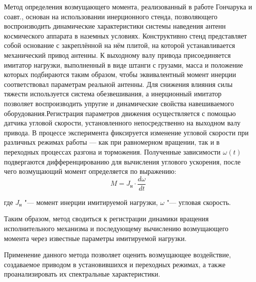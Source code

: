 Метод определения возмущающего момента, реализованный в работе Гончарука и соавт., %
основан на использовании инерционного стенда, позволяющего воспроизводить динамические характеристики системы наведения антенн космического аппарата в наземных условиях. Конструктивно стенд представляет собой основание с закреплённой на нём плитой, на которой устанавливается механический привод антенны. К выходному валу привода присоединяется имитатор нагрузки, выполненный в виде штанги с грузами, масса и положение которых подбираются таким образом, чтобы эквивалентный момент инерции соответствовал параметрам реальной антенны. Для снижения влияния силы тяжести используется система обезвешивания, а инерционный имитатор позволяет воспроизводить упругие и динамические свойства навешиваемого оборудования.Регистрация параметров движения осуществляется с помощью датчика угловой скорости, установленного непосредственно на выходном валу привода. В процессе эксперимента фиксируется изменение угловой скорости при различных режимах работы — как при равномерном вращении, так и в переходных процессах разгона и торможения. Полученные зависимости $\omega(t)$ подвергаются дифференцированию для вычисления углового ускорения, после чего возмущающий момент определяется по выражению:
\begin{equation}
	\label{eq:eq_M_disturb}
	M=J_{\text{н}}\cdot \frac{d\omega}{dt}
\end{equation}

где \(J_{\text{н}}\) "--- момент инерции имитируемой нагрузки, \(\omega\) "--- угловая скорость.

Таким образом, метод сводиться к регистрации динамики вращения исполнительного механизма и последующему вычислению возмущающего момента через известные параметры имитируемой нагрузки.

Применение данного метода позволяет оценить возмущающее воздействие, создаваемое приводом в установившихся и переходных режимах, а также проанализировать их спектральные характеристики.

